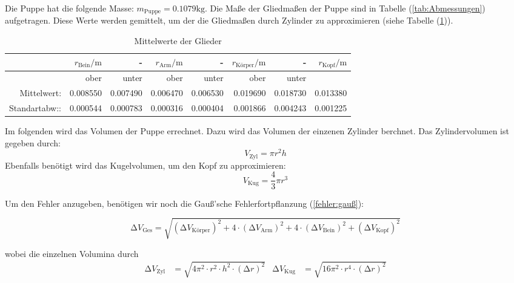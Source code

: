 Die Puppe hat die folgende Masse: $m_{\text{Puppe}} = 0.1079\unit{\kilo\gram}$.
Die Maße der Gliedmaßen der Puppe sind in Tabelle (\ref{tab:Abmessungen}) aufgetragen.
Diese Werte werden gemittelt, um der die Gliedmaßen durch Zylinder zu approximieren (siehe Tabelle (\ref{tab:MittelwertGlieder})).

\begin{table}
  \centering
  \caption{Mittelwerte der Glieder}
  \label{tab:MittelwertGlieder}
  \begin{tabular}{rrrrrrrr}
    \toprule
       & $r_{\text{Bein}} / \unit\meter$ &     - &     $r_{\text{Arm}} / \unit\meter$ &     - &    $r_{\text{Körper}} /  \unit\meter$ &     - &    $r_{\text{Kopf}} /  \unit\meter$\\
    \midrule
     & ober & unter & ober & unter& ober & unter & \\
    Mittelwert: & 0.008550 & 0.007490 & 0.006470 & 0.006530 & 0.019690 & 0.018730 & 0.013380 \\
    Standartabw:: & 0.000544 & 0.000783 & 0.000316 & 0.000404 & 0.001866 & 0.004243 & 0.001225 \\
    \bottomrule
    \end{tabular}
\end{table}

Im folgenden wird das Volumen der Puppe errechnet.
Dazu wird das Volumen der einzenen Zylinder berchnet.
Das Zylindervolumen ist gegeben durch:
\begin{equation*}
  V_{\text{Zyl}} = \pi r^2 h
\end{equation*}
Ebenfalls benötigt wird das Kugelvolumen, um den Kopf zu approximieren:
\begin{equation*}
  V_{\text{Kug}} = \frac{4}{3} \pi r^3
\end{equation*}

Um den Fehler anzugeben, benötigen wir noch die Gauß'sche Fehlerfortpflanzung (\ref{fehler:gauß}):

\begin{equation}
  \increment V_{\text{Ges}} = \sqrt{(\increment V_{\text{Körper}})^2 + 4 \cdot (\increment V_{\text{Arm}})^2 
    + 4 \cdot (\increment V_{\text{Bein}})^2 + (\increment V_{\text{Kopf}})^2}
\end{equation}

wobei die einzelnen Volumina durch 
\begin{align*}
  \increment V_{\text{Zyl}} &= \sqrt{4 \pi^2 \cdot r^2 \cdot h^2 \cdot (\increment r)^2} & 
  \increment V_{\text{Kug}} &= \sqrt{16 \pi^2 \cdot r^4 \cdot (\increment r)^2}
\end{align*}


